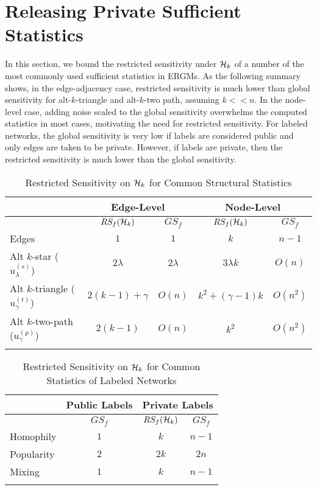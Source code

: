\section{Releasing Private Sufficient Statistics}
\label{sec:release_suff_stats}

In this section, we bound the restricted sensitivity under $\mathcal{H}_{k}$ of a number of the most commonly used sufficient statistics in ERGMs. As the following summary shows, in the edge-adjacency case, restricted sensitivity is much lower than global sensitivity for alt-$k$-triangle and alt-$k$-two path, assuming $k << n$. In the node-level case, adding noise scaled to the global sensitivity overwhelms the computed statistics in most cases, motivating the need for restricted sensitivity. For labeled networks, the global sensitivity is very low if labels are considered public and only edges are taken to be private. However, if labels are private, then the restricted sensitivity is much lower than the global sensitivity. 

\begin{table}[!ht]
	\caption{Restricted Sensitivity on $\mathcal{H}_k$ for Common Structural Statistics}
	\begin{center}
	\begin{tabular}{|l|c|c|c|c|}
		\hhline{|=====|}
		 & \multicolumn{2}{c|}{Edge-Level} & \multicolumn{2}{c|}{Node-Level} \\\hline
		& $RS_f(\mathcal{H}_k)$ & $GS_f$ & $RS_f(\mathcal{H}_k)$ & $GS_f$ \\ \hline
		Edges & $1$ & $1$ & $k$  & $n-1$\\ \hline
		Alt $k$-star ($u_\lambda^{(s)}$) & $2\lambda$ & $2\lambda$  & $3 \lambda k$  & $O(n)$\\ \hline
		Alt $k$-triangle  ($u_\gamma^{(t)}$)  & $2(k-1) + \gamma$ & $O(n)$  & $k^2 + (\gamma -1)k$ & $O(n^2)$\\ \hline
		Alt $k$-two-path  ($u_\gamma^{(p)}$)  & $2(k-1)$ & $O(n)$    & $k^2$ & $O(n^2)$\\	
		\hhline{|=====|}
	\end{tabular}
	\end{center}
	\label{tab:altsuffstatsrestr}
\end{table}

\begin{table}[!ht]
		\caption{Restricted Sensitivity on $\mathcal{H}_k$ for Common Statistics of  Labeled Networks}
		\begin{center}
		\begin{tabular}{|l|c|c|c|}
		\hhline{|====|}
		& \multicolumn{1}{c|}{Public Labels} & \multicolumn{2}{c|}{Private Labels} \\\hline
		 & $GS_f$ & $RS_f(\mathcal{H}_k)$ & $GS_f$ \\ \hline
		Homophily &  $1$ & $k$  & $n-1$\\ \hline
		Popularity  & $2$  & $2k$ & $2n$\\ \hline
		Mixing & $1$    & $k$ & $n-1$\\	 \hhline{|====|}
	\end{tabular}
	\label{tab:labeluffstatsrestr}
	\end{center}
\end{table}

